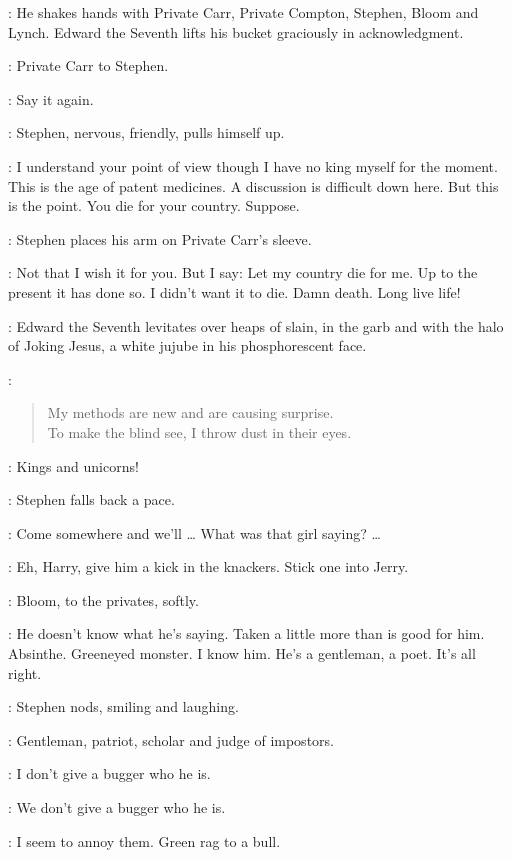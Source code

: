 :
He shakes hands with Private Carr, Private Compton,
Stephen, Bloom and Lynch.
Edward the Seventh lifts his bucket graciously in acknowledgment.

:
Private Carr to Stephen.

\Carr:
Say it again.

:
Stephen, nervous, friendly, pulls himself up.

\Stephen:
I understand your point of view though I have no king myself for the moment.
This is the age of patent medicines.
A discussion is difficult down here.
But this is the point.
You die for your country.
Suppose.

:
Stephen places his arm on Private Carr's sleeve.

\Stephen:
Not that I wish it for you.
But I say: Let my country die for me.
Up to the  present it has done so.
I didn't want it to die.
Damn death.
Long live life!

:
Edward the Seventh levitates over heaps of slain,
in the garb and with the halo of Joking Jesus,
a white jujube in his phosphorescent face.

\EdwardSeventh:
\begin{verse}
    My methods are new and are causing surprise.\\
    To make the blind see, I throw dust in their eyes.
\end{verse}

\Stephen:
Kings and unicorns!

:
Stephen falls back a pace.

\Stephen:
Come somewhere and we'll \ldots
What was that girl saying? \ldots

\Compton[2]:
Eh, Harry, give him a kick in the knackers.
Stick one into Jerry.

:
Bloom, to the privates, softly.

\Bloom:
He doesn't know what he's saying.
Taken a little more than is good for him.
Absinthe.
Greeneyed monster.
I know him.
He's a gentleman, a poet.
It's all right.

:
Stephen nods, smiling and laughing.

\Stephen:
Gentleman, patriot, scholar and judge of impostors.

\Carr:
I don't give a bugger who he is.

\Compton:
We don't give a bugger who he is.

\Stephen:
I seem to annoy them.
Green rag to a bull.


